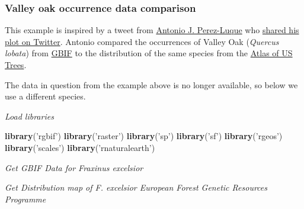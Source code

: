 \documentclass[author-year, review, 11pt]{components/elsarticle} %
\newenvironment{Shaded}{\begin{snugshade}}{\end{snugshade}}
\newcommand{\KeywordTok}[1]{\textcolor[rgb]{0.13,0.29,0.53}{\textbf{#1}}}
\newcommand{\DataTypeTok}[1]{\textcolor[rgb]{0.13,0.29,0.53}{#1}}
\newcommand{\StringTok}[1]{\textcolor[rgb]{0.31,0.60,0.02}{#1}}
\newcommand{\OperatorTok}[1]{\textcolor[rgb]{0.81,0.36,0.00}{\textbf{#1}}}
\newcommand{\NormalTok}[1]{#1}
\begin{document}
\subsubsection{Valley oak occurrence data
comparison}\label{valley-oak-occurrence-data-comparison}

This example is inspired by a tweet from
\href{https://twitter.com/ajpelu}{Antonio J. Perez-Luque} who
\href{https://twitter.com/ajpelu/status/473951167567757312}{shared his
plot on Twitter}. Antonio compared the occurrences of Valley Oak
(\emph{Quercus lobata}) from \href{http://www.gbif.org/}{GBIF} to the
distribution of the same species from the
\href{http://esp.cr.usgs.gov/data/little/}{Atlas of US Trees}.

The data in question from the example above is no longer available, so
below we use a different species.

\emph{Load libraries}

\begin{Shaded}
\begin{Highlighting}[]
\KeywordTok{library}\NormalTok{(}\StringTok{'rgbif'}\NormalTok{)}
\KeywordTok{library}\NormalTok{(}\StringTok{'raster'}\NormalTok{)}
\KeywordTok{library}\NormalTok{(}\StringTok{'sp'}\NormalTok{)}
\KeywordTok{library}\NormalTok{(}\StringTok{'sf'}\NormalTok{)}
\KeywordTok{library}\NormalTok{(}\StringTok{'rgeos'}\NormalTok{)}
\KeywordTok{library}\NormalTok{(}\StringTok{'scales'}\NormalTok{)}
\KeywordTok{library}\NormalTok{(}\StringTok{'rnaturalearth'}\NormalTok{)}
\end{Highlighting}
\end{Shaded}

\emph{Get GBIF Data for Fraxinus excelsior}

\begin{Shaded}
\end{Shaded}

\emph{Get Distribution map of F. excelsior European Forest Genetic
Resources Programme}
\end{document}
